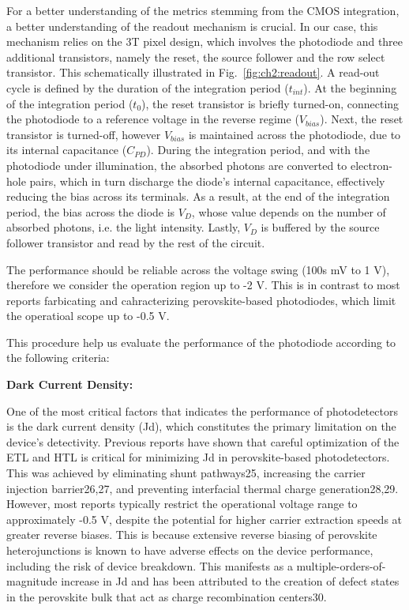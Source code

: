 For a better understanding of the metrics stemming from the CMOS integration, a better understanding of the readout mechanism is crucial. In our case, this mechanism relies on the 3T pixel design, which involves the photodiode and three additional transistors, namely the reset, the source follower and the row select transistor. This schematically illustrated in Fig.~\ref{fig:ch2:readout}. A read-out cycle is defined by the duration of the  integration period ($t_{int}$). At the beginning of the integration period ($t_0$), the reset transistor is briefly turned-on, connecting the photodiode to a reference voltage in the reverse regime ($V_{bias}$). Next, the reset transistor is turned-off, however $V_{bias}$ is maintained across the photodiode, due to its internal capacitance ($C_{PD}$). During the integration period, and with the photodiode under illumination, the absorbed photons are converted to electron-hole pairs, which in turn discharge the diode's internal capacitance, effectively reducing the bias across its terminals. As a result, at the end of the integration period, the bias across the diode is $V_D$, whose value depends on the number of absorbed photons, i.e. the light intensity. Lastly, $V_D$ is buffered by the source follower transistor and read by the rest of the circuit. 

The performance should be reliable across the voltage swing (100s mV to 1 V), therefore we consider the operation region up to -2 V. This is in contrast to most reports farbicating and cahracterizing perovskite-based photodiodes, which limit the operatioal scope up to -0.5 V.

This procedure help us evaluate the performance of the photodiode according to the following criteria: 

\textbf{Dark Current Density:}

One of the most critical factors that indicates the performance of photodetectors is the dark current density (Jd), which constitutes the primary limitation on the device’s detectivity. Previous reports have shown that careful optimization of the ETL and HTL is critical for minimizing Jd in perovskite-based photodetectors. This was achieved by eliminating shunt pathways25, increasing the carrier injection barrier26,27, and preventing interfacial thermal charge generation28,29. However, most reports typically restrict the operational voltage range to approximately -0.5 V, despite the potential for higher carrier extraction speeds at greater reverse biases. This is because extensive reverse biasing of perovskite heterojunctions is known to have adverse effects on the device performance, including the risk of device breakdown. This manifests as a multiple-orders-of-magnitude increase in Jd and has been attributed to the creation of defect states in the perovskite bulk that act as charge recombination centers30. 

